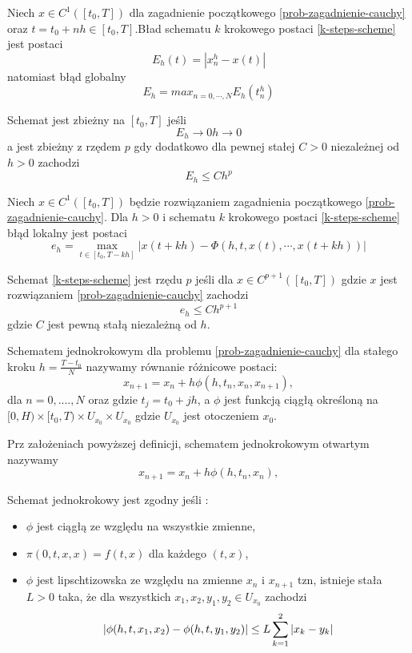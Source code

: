 \documentclass[12pt,a4paper]{report}
\begin{document}
\begin{definition}  
Niech $ x \in C^{1}([t_0,T])$ dla zagadnienie początkowego \ref{prob-zagadnienie-cauchy} oraz $t=t_0 +nh \in [t_0,T]$.Bład schematu $k$ krokowego postaci \ref{k-steps-scheme} jest postaci 
$$
E_h(t) = |x^{h}_{n} - x(t)|
$$ 
natomiast błąd globalny 
$$
E_h = max_{n=0,\cdots,N} E_h(t^{h}_{n})
$$
\end{definition}
\begin{definition}
Schemat jest zbieżny na $[t_0,T]$ jeśli 
$$
E_h \to 0  h \to 0
$$
a jest zbieżny z rzędem $p$ gdy dodatkowo dla pewnej stałej $C>0$ niezależnej od $h>0$ zachodzi 
$$
E_h \leq C h^p
$$
\end{definition}
\begin{definition}
Niech $x \in C^1([t_0,T]) $ będzie rozwiązaniem zagadnienia początkowego \ref{prob-zagadnienie-cauchy}. Dla $h>0$ i schematu $k$ krokowego postaci \ref{k-steps-scheme} błąd lokalny jest postaci
\begin{equation}
e_h = \max_{t \in [t_0,T-kh]} |x(t + kh) - \Phi (h,t,x(t),\cdots, x(t + kh))|
\end{equation}
\end{definition}
\begin{definition} 
Schemat \ref{k-steps-scheme} jest rzędu $p$ jeśli dla $x \in C^{p+1}([t_0,T])$ gdzie $x$ jest rozwiązaniem \ref{prob-zagadnienie-cauchy} zachodzi
$$
e_h \leq C h^{p+1}
$$
gdzie $C$ jest pewną stałą niezależną od $h$. 
\end{definition}
\begin{definition}  
Schematem jednokrokowym dla problemu \ref{prob-zagadnienie-cauchy} dla stałego kroku $h = \frac{T-t_0}{N}$ nazywamy równanie różnicowe postaci:
$$
x_{n+1} = x_n + h \phi(h,t_{n},x_{n},x_{n+1}),  
$$
dla $n = 0,....,N$ oraz gdzie $t_{j} = t_{0} + jh$, a $\phi$ jest funkcją ciągłą określoną na $[0,H) \times [t_0,T) \times U_{x_0} \times U_{x_0} $ gdzie $ U_{x_0} $ jest otoczeniem $x_0$.   
\end{definition}
\begin{definition}
Prz założeniach powyższej definicji, schematem jednokrokowym otwartym nazywamy 
$$
x_{n+1} = x_n + h \phi(h,t_{n},x_{n}),  
$$
\end{definition}
 
\begin{definition}\label{definition-consistency}
Schemat jednokrokowy jest zgodny jeśli :
\begin{itemize}
\item $\phi$ jest ciągłą ze względu na wszystkie zmienne,
\item $\pi(0,t,x,x) = f(t,x)$ dla każdego $(t,x)$,
\item $\phi$ jest lipschtizowska ze względu na zmienne $x_n$ i $x_{n+1}$ tzn, istnieje stała $L>0$ taka, że dla wszystkich $x_1,x_2,y_1,y_2 \in U_{x_0}$ zachodzi
$$
\abs{\phi(h,t,x_1,x_2) - \phi(h,t,y_1,y_2)} \leq L  \sum_{k=1}^{2} \abs{x_k - y_k}
$$
\end{itemize}

\end{definition}
\end{document}
